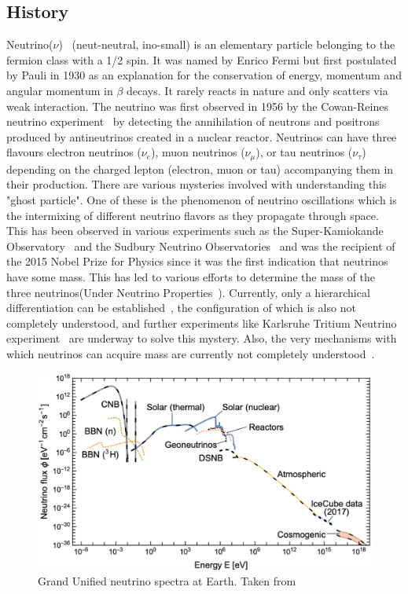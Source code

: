 \subsection{History}
Neutrino($\nu$)~\cite{10.1063/1.2995181} (neut-neutral, ino-small) is an elementary particle belonging to the fermion class with a 1/2 spin. It was named by Enrico Fermi but first postulated by Pauli in 1930 as an explanation for the conservation of energy, momentum and angular momentum in $\beta$ decays. It rarely reacts in nature and only scatters via weak interaction. The neutrino was first observed in 1956 by the Cowan-Reines neutrino experiment~\cite{PhysRev.92.830} by detecting the annihilation of neutrons and positrons produced by antineutrinos created in a nuclear reactor. Neutrinos can have three flavours electron neutrinos ($\nu_e$), muon neutrinos ($\nu_{\mu}$), or tau neutrinos ($\nu_{\tau}$) depending on the charged lepton (electron, muon or tau) accompanying them in their production. There are various mysteries involved with understanding this "ghost particle". One of these is the phenomenon of neutrino oscillations which is the intermixing of different neutrino flavors as they propagate through space. This has been observed in various experiments such as the Super-Kamiokande Observatory~\cite{Fukuda_1998} and the Sudbury Neutrino Observatories~\cite{BELLERIVE201630} and was the recipient of the 2015 Nobel Prize for Physics since it was the first indication that neutrinos have some mass. This has led to various efforts to determine the mass of the three neutrinos(Under Neutrino Properties~\cite{ParticleDataGroup:2024cfk}). Currently, only a hierarchical differentiation can be established~\cite{Qian_2015}, the configuration of which is also not completely understood, and further experiments like Karlsruhe Tritium Neutrino experiment~\cite{aker2024directneutrinomassmeasurementbased} are underway to solve this mystery. Also, the very mechanisms with which neutrinos can acquire mass are currently not completely understood~\cite{CERN_courier_nu_mass}. 
\begin{figure}[t!]
  \centering
  \includegraphics[width=14.5cm]{thesis_figures/CRnNu/Neutrino spectra.jpg}
  \caption{Grand Unified neutrino spectra at Earth. Taken from ~\cite{Vitagliano:2019yzm}}
  \label{fig:Neutrino-spectra}
\end{figure}

